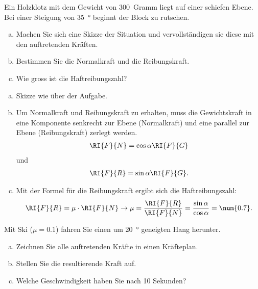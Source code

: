 \documentclass[12pt,a4paper,twoside]{article}
\begin{document}
\begin{aufgabe}
	Ein Holzklotz mit dem Gewicht von \SI{300}{Gramm} liegt auf einer schiefen Ebene.
	Bei einer Steigung von \SI{35}{\degree} beginnt der Block zu rutschen.
	\begin{enumerate}[a)]
		\item Machen Sie sich eine Skizze der Situation und vervollständigen sie diese mit den auftretenden Kräften.
		\item Bestimmen Sie die Normalkraft und die Reibungskraft.
		\item Wie gross ist die Haftreibungszahl?
	\end{enumerate}
	\begin{loesung}
		\begin{enumerate} [a)]
			\item Skizze wie über der Aufgabe. 
			\item Um Normalkraft und Reibungskraft zu erhalten, muss die Gewichtskraft in eine Komponente senkrecht zur Ebene (Normalkraft)
				und eine parallel zur Ebene (Reibungskraft) zerlegt werden.
				\begin{eqnarray*}
					\RI{F}{N}=\cos\alpha\RI{F}{G}
				\end{eqnarray*}
				und
				\begin{eqnarray*}
					\RI{F}{R}=\sin\alpha\RI{F}{G}\text{.}
				\end{eqnarray*}
			\item Mit der Formel für die Reibungskraft ergibt sich die Haftreibungszahl:
				\begin{eqnarray*}
					\RI{F}{R}=\mu\cdot\RI{F}{N}\to\mu=\frac{\RI{F}{R}}{\RI{F}{N}}=\frac{\sin\alpha}{\cos\alpha}=\num{0.7}\text{.}
				\end{eqnarray*}
		\end{enumerate}
	\end{loesung}
\end{aufgabe}

\newpage

\begin{aufgabe}
	Mit Ski ($\mu=0.1$) fahren Sie einen um \SI{20}{\degree} geneigten Hang herunter.

	\begin{enumerate}[a)]
		\item Zeichnen Sie alle auftretenden Kräfte in einen Kräfteplan.
		\item Stellen Sie die resultierende Kraft auf.
		\item Welche Geschwindigkeit haben Sie nach 10 Sekunden?
	\end{enumerate}
\end{aufgabe}
\end{document}
